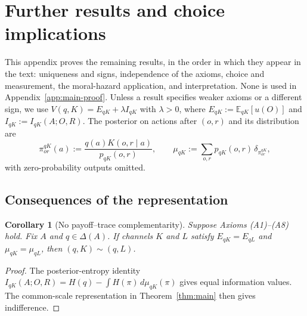 \documentclass[11pt,a4paper]{article}
\newtheorem{corollary}[theorem]{Corollary}
\theoremstyle{definition}
\newcommand{\D}{\Delta}
\newcommand{\E}{\mathbb E}
\newcommand{\I}{I}
\newcommand{\Sh}{H}
\newcommand{\1}{\mathbf 1}
\begin{document}
\section{Further results and choice implications}\label{app:auxiliary-results}

This appendix proves the remaining results, in the order in which they
appear in the text: uniqueness and signs, independence of the axioms,
choice and measurement, the moral-hazard application, and interpretation.
None is used in Appendix~\ref{app:main-proof}.
Unless a result specifies weaker axioms or a different sign, we use
$V(q,K)=E_{qK}+\lambda\I_{qK}$ with $\lambda>0$, where
$E_{qK}:=\E_{qK}[u(O)]$ and $\I_{qK}:=\I_{qK}(A;O,R)$.
The posterior on actions after $(o,r)$ and its distribution are
\[
 \pi^{qK}_{or}(a):=\frac{q(a)K(o,r\mid a)}{p_{qK}(o,r)},
 \qquad
 \mu_{qK}:=\sum_{o,r}p_{qK}(o,r)\,\delta_{\pi^{qK}_{or}},
\]
with zero-probability outputs omitted.

\subsection{Consequences of the representation}
\label{app:representation-consequences}

\begin{corollary}[No payoff--trace complementarity]\label{cor:matching}
Suppose Axioms \textup{(A1)--(A8)} hold.  Fix $A$ and $q\in\D(A)$.  If channels $K$ and $L$ satisfy
$E_{qK}=E_{qL}$ and $\mu_{qK}=\mu_{qL}$, then $(q,K)\sim(q,L)$.
\end{corollary}

\begin{proof}
The posterior-entropy identity
$\I_{qK}(A;O,R)=\Sh(q)-\int\Sh(\pi)\,d\mu_{qK}(\pi)$
gives equal information values.  The common-scale representation in
Theorem~\ref{thm:main} then gives indifference.
\end{proof}
\end{document}
